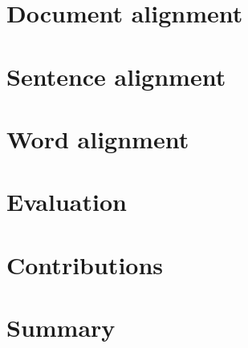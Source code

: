 




\tableofcontents



\chapter{Document alignment}
\chapter{Sentence alignment}
\chapter{Word alignment}

\chapter{Evaluation}
\chapter{Contributions}
\chapter{Summary}

%
\printbibliography
